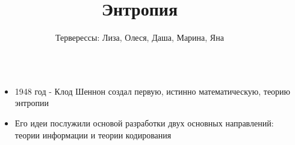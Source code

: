 \documentclass[final]{beamer}
\title{Энтропия} %
\author{Терверессы: Лиза, Олеся, Даша, Марина, Яна} %
\institute{БЭК 171} %
\newlength{\sepwid}
\newlength{\onecolwid}
\begin{document}

\setlength{\belowcaptionskip}{2ex} %
\setlength\belowdisplayshortskip{2ex} %

\begin{frame}[t] %

\begin{columns}[t] %

\begin{column}{\sepwid}\end{column} %

\begin{column}{\onecolwid} %



\begin{alertblock}{}
    \begin{itemize}
    \item 1948 год - Клод Шеннон создал первую, истинно математическую, теорию энтропии
	\item Его идеи послужили основой разработки двух основных направлений: теории информации и теории кодирования
    \end{itemize}
    
    \end{alertblock}


\end{column}
\end{columns}
\end{frame}
\end{document}
